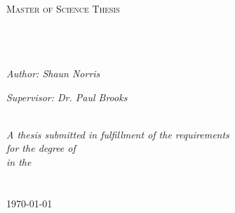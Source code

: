 \documentclass[
12pt, %
english, %
singlespacing, %
headsepline, %
]{MastersDoctoralThesis} %
\author{Shaun William \textsc{Norris}} %
\begin{document}
\frontmatter %

\pagestyle{plain} %


\begin{titlepage}
\begin{center}

\textsc{\LARGE \univname}\\[1.5cm] %
\textsc{\Large Master of Science Thesis}\\[0.5cm] %

\HRule \\[0.4cm] %
{\huge \bfseries \ttitle}\\[0.4cm] %
\HRule \\[1.5cm] %
 
\begin{minipage}{0.4\textwidth}
\begin{flushleft} \large
\emph{Author: Shaun Norris}\\
\href{http://www.newestnorris.com}{\authorname} %
\end{flushleft}
\end{minipage}
\begin{minipage}{0.4\textwidth}
\begin{flushright} \large
\emph{Supervisor: Dr. Paul Brooks} \\
\href{https://sites.google.com/a/vcu.edu/jpbrooks/}{\supname} %
\end{flushright}
\end{minipage}\\[3cm]
 
\large \textit{A thesis submitted in fulfillment of the requirements\\ for the degree of \degreename}\\[0.3cm] %
\textit{in the}\\[0.4cm]
\groupname\\\deptname\\[2cm] %
 
{\large \today}\\[4cm] %
 
\vfill
\end{center}
\end{titlepage}
\end{document}
